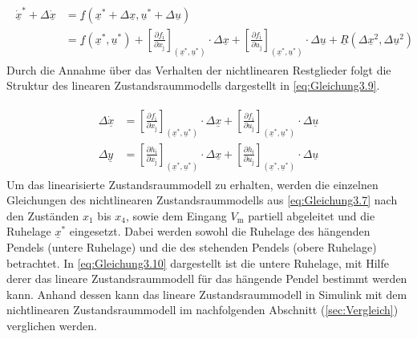 \begin{align} \label{eq:Gleichung3.8}
    \begin{split}
        \dot{\underline{x}}^{*}+\Delta{\dot{\underline{x}}} &=\underline{f}(\underline{x}^{*}+\Delta{\underline{x}},\underline{u}^{*}+\Delta{\underline{u}}) \\
        &=\underline{f}(\underline{x}^{*},\underline{u}^{*})+\left[\frac{\partial f_{\mathrm{i}}}{\partial x_{\mathrm{j}}}\right]_{(\underline{x}^{*}, \underline{u}^{*})}\cdot\Delta{\underline{x}}+\left[\frac{\partial f_{\mathrm{i}}}{\partial u_{\mathrm{j}}}\right]_{(\underline{x}^{*},\underline{u}^{*})}\cdot\Delta{\underline{u}}+\underline{R}(\Delta{\underline{x}^2}, \Delta{\underline{u}^2})
    \end{split}
\end{align}
\newline
Durch die Annahme über das Verhalten der nichtlinearen Restglieder folgt die Struktur des linearen Zustandsraummodells dargestellt in \autoref{eq:Gleichung3.9}.

\begin{align} \label{eq:Gleichung3.9}
    \begin{split}
        \Delta\dot{\underline{x}} &= \left[\frac{\partial f_{\mathrm{i}}}{\partial x_{\mathrm{j}}}\right]_{(\underline{x}^{*}, \underline{u}^{*})}\cdot\Delta{\underline{x}}+\left[\frac{\partial f_{\mathrm{i}}}{\partial u_{\mathrm{j}}}\right]_{(\underline{x}^{*},\underline{u}^{*})}\cdot\Delta{\underline{u}} \\   
        \Delta{\underline{y}} &= \left[\frac{\partial h_{\mathrm{i}}}{\partial x_{\mathrm{j}}}\right]_{(\underline{x}^{*}, \underline{u}^{*})}\cdot\Delta{\underline{x}}+\left[\frac{\partial h_{\mathrm{i}}}{\partial u_{\mathrm{j}}}\right]_{(\underline{x}^{*},\underline{u}^{*})}\cdot\Delta{\underline{u}}
    \end{split}
\end{align}
\newline
Um das linearisierte Zustandsraummodell zu erhalten, werden die einzelnen Gleichungen des nichtlinearen Zustandsraummodells aus \autoref{eq:Gleichung3.7} nach den Zuständen $x_{\mathrm{1}}$ bis $x_{\mathrm{4}}$, sowie dem Eingang $V_{\mathrm{m}}$ partiell abgeleitet und die Ruhelage $\underline{x}^{*}$ eingesetzt. Dabei werden sowohl die Ruhelage des hängenden Pendels (untere Ruhelage) und die des stehenden Pendels (obere Ruhelage) betrachtet. In \autoref{eq:Gleichung3.10} dargestellt ist die untere Ruhelage, mit Hilfe derer das lineare Zustandsraummodell für das hängende Pendel bestimmt werden kann. Anhand dessen kann das lineare Zustandsraummodell in Simulink mit dem nichtlinearen Zustandsraummodell im nachfolgenden Abschnitt (\autoref{sec:Vergleich}) verglichen werden.

